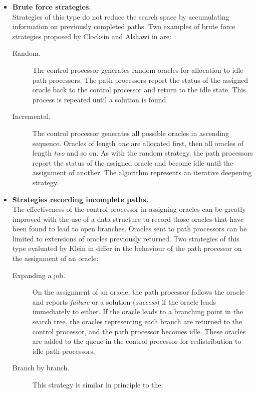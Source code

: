 \begin{itemize}
\item{\textbf{Brute force strategies}.\\
  Strategies of this type do not
  reduce the search space by accumulating information on previously
  completed paths.  Two examples of brute force strategies proposed
  by Clocksin and Alshawi in \cite{CA87} are:
  \begin{description}
  \item[Random.]{ The control processor generates random oracles for allocation
    to idle path processors.  The path processors report the status of the assigned
    oracle back to the control processor and return to the idle state.  This process
    is repeated until a solution is found.}
  \item[Incremental.]{ The control processor generates all possible oracles in
    ascending sequence.  Oracles of length \textit{one} are allocated first, then
    all oracles of length \textit{two} and so on.  As with the random strategy, the
    path processors report the status of the assigned oracle and become idle until the
    assignment of another.  The algorithm represents an iterative deepening strategy.}
  \end{description}
  }
\item{\textbf{Strategies recording incomplete paths.}\\
  The effectiveness of the control processor in assigning oracles can be greatly
  improved with the use of a data structure to record those oracles that have
  been found to lead to open branches.  Oracles sent
  to path processors can be limited to extensions of oracles previously returned.
  Two strategies of this type evaluated by Klein in \cite{Kle91} differ in the behaviour of
  the path processor on the assignment of an oracle:
  \begin{description}
  \item[Expanding a job.]{ On the assignment of an oracle, the path processor
    follows the oracle and reports \textit{failure} or a solution (\textit{success}) if
    the oracle leads immediately to either.
    If the oracle leads to a branching point in the search tree, the oracles
    representing each branch are returned to the control processor, and the path
    processor becomes idle.  These oracles are added to the queue in the control
    processor for redistribution to idle path processors.}
  \item[Branch by branch.]{ This strategy is similar in principle to the
}
\end{description}}
\end{itemize}
